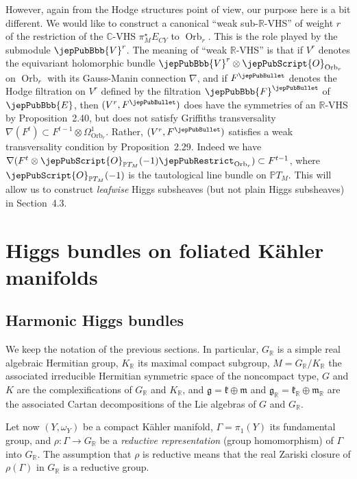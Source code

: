 However, again from the Hodge structures point of view, our purpose here is a bit different. We would like to construct a canonical ``weak sub-$\mathbb R$-VHS'' of weight $r$ of the restriction of the $\mathbb C$-VHS $\pi_M^\star E_{CY}$ to $\operatorname{Orb}_r$. This is the role played by the submodule $\jepPubBbb{V}^r$. The meaning of ``weak $\mathbb R$-VHS'' is that if $V^r$ denotes the equivariant holomorphic bundle $\jepPubBbb{V}^r\otimes\jepPubScript{O}_{\operatorname{Orb}_r}$ on $\operatorname{Orb}_r$ with its Gauss-Manin connection $\nabla$, and if $F^\jepPubBullet$ denotes the Hodge filtration on $V^r$ defined by the filtration $\jepPubBbb{F}^\jepPubBullet$ of $\jepPubBbb{E}$, then $(V^r,F^\jepPubBullet)$ does have the symmetries of an $\mathbb R$-VHS by Proposition~2.40, but does not satisfy Griffiths transversality $\nabla(F^t)\subset F^{t-1}\otimes\Omega^1_{\operatorname{Orb}_r}$. Rather, $(V^r,F^\jepPubBullet)$ satisfies a weak transversality condition by Proposition~2.29. Indeed we have $\nabla(F^t\otimes\jepPubScript{O}_{\mathbb PT_M}(-1)\jepPubRestrict_{\operatorname{Orb}_r})\subset F^{t-1}$, where $\jepPubScript{O}_{\mathbb PT_M}(-1)$ is the tautological line bundle on $\mathbb PT_M$. This will allow us to construct \emph{leafwise} Higgs subsheaves (but not plain Higgs subsheaves) in Section~4.3.

\section{Higgs bundles on foliated Kähler manifolds}
\subsection{Harmonic Higgs bundles}
We keep the notation of the previous sections. In particular, $G_{\mathbb R}$ is a simple real algebraic Hermitian group, $K_{\mathbb R}$ its maximal compact subgroup, $M=G_{\mathbb R}/K_{\mathbb R}$ the associated irreducible Hermitian symmetric space of the noncompact type, $G$ and $K$ are the complexifications of $G_{\mathbb R}$ and $K_{\mathbb R}$, and $\mathfrak g=\mathfrak k\oplus\mathfrak m$ and $\mathfrak g_{\mathbb R}=\mathfrak k_{\mathbb R}\oplus\mathfrak m_{\mathbb R}$ are the associated Cartan decompositions of the Lie algebras of $G$ and $G_{\mathbb R}$.

Let now $(Y,\omega_Y)$ be a compact Kähler manifold, $\Gamma=\pi_1(Y)$ its fundamental group, and $\rho:\Gamma\to G_{\mathbb R}$ be a \emph{reductive representation} (group homomorphism) of $\Gamma$ into $G_{\mathbb R}$. The assumption that $\rho$ is reductive means that the real Zariski closure of $\rho(\Gamma)$ in $G_{\mathbb R}$ is a reductive group.

